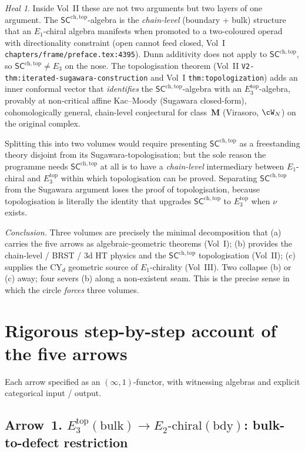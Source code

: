 \documentclass[11pt]{article}
\theoremstyle{definition}
\theoremstyle{remark}
\newtheorem{heal}[thm]{Heal}
\newcommand{\Eone}{E_1}
\newcommand{\Etwo}{E_2}
\newcommand{\Ethree}{E_3}
\newcommand{\SCchtop}{\mathsf{SC}^{\mathrm{ch,top}}}
\begin{document}
\begin{heal}
Inside Vol~II these are not two arguments but two layers of one
argument. The $\SCchtop$-algebra is the \emph{chain-level}
(boundary + bulk) structure that an $\Eone$-chiral algebra
manifests when promoted to a two-coloured operad with
directionality constraint (open cannot feed closed,
Vol~I \texttt{chapters/frame/preface.tex:4395}). Dunn additivity
does not apply to $\SCchtop$, so $\SCchtop \neq \Ethree$ on the
nose. The topologisation theorem
(Vol~II \texttt{V2-thm:iterated-sugawara-construction} and Vol~I
\texttt{thm:topologization}) adds an inner conformal vector
that \emph{identifies} the $\SCchtop$-algebra with an
$\Ethree^{\mathrm{top}}$-algebra, provably at non-critical
affine Kac--Moody (Sugawara closed-form), cohomologically
general, chain-level conjectural for class~$\mathbf{M}$
(Virasoro, $\cW_N$) on the original complex.

Splitting this into two volumes would require presenting
$\SCchtop$ as a freestanding theory disjoint from its
Sugawara-topologisation; but the sole reason the programme needs
$\SCchtop$ at all is to have a \emph{chain-level} intermediary
between $\Eone$-chiral and $\Ethree^{\mathrm{top}}$ within which
topologisation can be proved. Separating $\SCchtop$ from the
Sugawara argument loses the proof of topologisation, because
topologisation is literally the identity that upgrades
$\SCchtop$ to $\Ethree^{\mathrm{top}}$ when $\nu$ exists.

\emph{Conclusion.} Three volumes are precisely the minimal
decomposition that (a) carries the five arrows as
algebraic-geometric theorems (Vol~I); (b) provides the
chain-level / BRST / 3d HT physics and the $\SCchtop$
topologisation (Vol~II); (c) supplies the CY$_d$ geometric
source of $\Eone$-chirality (Vol~III). Two collapse (b) or (c)
away; four severs (b) along a non-existent seam. This is the
precise sense in which the circle \emph{forces} three volumes.
\end{heal}

\section{Rigorous step-by-step account of the five arrows}

Each arrow specified as an $(\infty, 1)$-functor, with witnessing
algebras and explicit categorical input / output.

\subsection*{Arrow~1. $\Ethree^{\mathrm{top}}(\mathrm{bulk}) \to
\Etwo\text{-chiral}(\mathrm{bdy})$: bulk-to-defect restriction}
\end{document}
